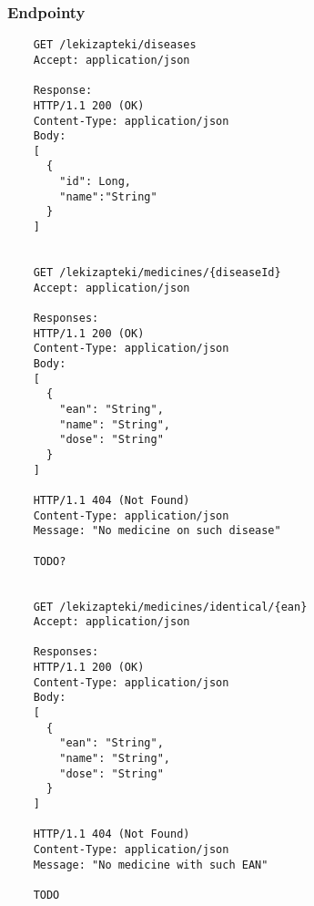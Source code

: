 \documentclass{article}
\begin{document}
  \subsubsection{Endpointy}
  \begin{lstlisting}
    GET /lekizapteki/diseases
    Accept: application/json

    Response:
    HTTP/1.1 200 (OK)
    Content-Type: application/json
    Body:
    [
      {
        "id": Long,
        "name":"String"
      }
    ]


    GET /lekizapteki/medicines/{diseaseId}
    Accept: application/json

    Responses:
    HTTP/1.1 200 (OK)
    Content-Type: application/json
    Body:
    [
      {
        "ean": "String",
        "name": "String",
        "dose": "String"
      }
    ]

    HTTP/1.1 404 (Not Found)
    Content-Type: application/json
    Message: "No medicine on such disease"

    TODO?


    GET /lekizapteki/medicines/identical/{ean}
    Accept: application/json

    Responses:
    HTTP/1.1 200 (OK)
    Content-Type: application/json
    Body:
    [
      {
        "ean": "String",
        "name": "String",
        "dose": "String"
      }
    ]

    HTTP/1.1 404 (Not Found)
    Content-Type: application/json
    Message: "No medicine with such EAN"

    TODO

  \end{lstlisting}
\end{document}
